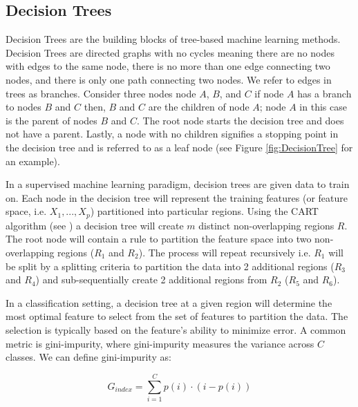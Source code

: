 \subsection{Decision Trees} \label{sec:DecisionTrees}

Decision Trees are the building blocks of tree-based machine learning methods.  Decision Trees are directed graphs with no cycles meaning there are no nodes with edges to the same node, there is no more than one edge connecting two nodes, and there is only one path connecting two nodes.  We refer to edges in trees as branches.  Consider three nodes node \(A\),  \(B\), and \(C\) if node \(A\) has a branch to nodes \(B\) and \(C\) then,  \(B\) and \(C\) are the children of node \(A\);  node \(A\) in this case is the parent of nodes \(B\) and \(C\).  The root node starts the decision tree and does not have a parent.  Lastly, a node with no children signifies a stopping point in the decision tree and is referred to as a leaf node (see Figure \ref{fig:DecisionTree} for an example).

In a supervised machine learning paradigm, decision trees are given data to train on.  Each node in the decision tree will represent the training features (or feature space, i.e. \(X_1,...,X_p\)) partitioned into particular regions. Using the CART algorithm (see \cite{CART}) a decision tree will create \(m\) distinct non-overlapping regions \(R\). The root node will contain a rule to partition the feature space into two non-overlapping regions (\(R_1\) and \(R_2\)). The process will repeat recursively i.e. \(R_1\) will be split by a splitting criteria to partition the data into 2 additional regions (\(R_3\) and \(R_4\))  and sub-sequentially create 2 additional regions from \(R_2\) (\(R_5\) and \(R_6\)). 


In a classification setting, a decision tree at a given region will determine the most optimal feature to select from the set of features to partition the data.  The selection is typically based on the feature's ability to minimize error.  A common metric is gini-impurity, where gini-impurity measures the variance across \(C\) classes. We can define gini-impurity as: 

\begin{equation}
\label{eq:GiniImpurity}
G_{index} = \sum_{i=1}^{C} p(i) \cdot (i - p(i))
\end{equation}

